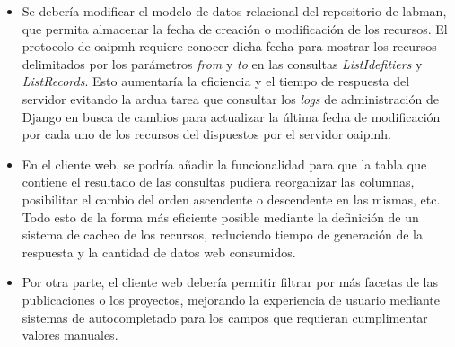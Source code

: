\begin{itemize}
	\item Se debería modificar el modelo de datos relacional del repositorio de \acrshort{labman}, que permita almacenar la fecha de creación o modificación de los recursos. El protocolo de \acrshort{oaipmh} requiere conocer dicha fecha para mostrar los recursos delimitados por los parámetros \textit{from} y \textit{to} en las consultas \textit{ListIdefitiers} y \textit{ListRecords}. Esto aumentaría la eficiencia y el tiempo de respuesta del servidor evitando la ardua tarea que consultar los \textit{logs} de administración de Django en busca de cambios para actualizar la última fecha de modificación por cada uno de los recursos del dispuestos por el servidor \acrshort{oaipmh}.
	\item En el cliente web, se podría añadir la funcionalidad para que la tabla que contiene el resultado de las consultas pudiera reorganizar las columnas, posibilitar el cambio del orden ascendente o descendente en las mismas, etc. Todo esto de la forma más eficiente posible mediante la definición de un sistema de cacheo de los recursos, reduciendo tiempo de generación de la respuesta y la cantidad de datos web consumidos.
	\item Por otra parte, el cliente web debería permitir filtrar por más facetas de las publicaciones o los proyectos, mejorando la experiencia de usuario mediante sistemas de autocompletado para los campos que requieran cumplimentar valores manuales.
\end{itemize}
